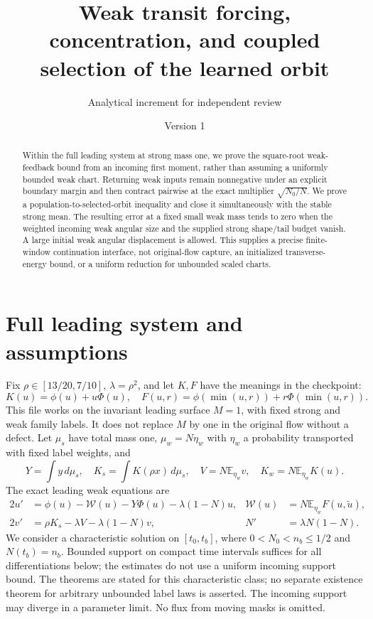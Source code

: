 \documentclass[11pt]{article}
\title{Weak transit forcing, concentration, and coupled selection of the learned orbit}
\author{Analytical increment for independent review}\date{Version 1}
\numberwithin{equation}{section}
\theoremstyle{remark}\newtheorem{remark}[theorem]{Remark}
\newcommand{\dd}{\,d}\newcommand{\E}{\mathbb E}\newcommand{\R}{\mathbb R}
\begin{document}
\maketitle
\begin{abstract}
Within the full leading system at strong mass one, we prove the square-root weak-feedback bound from an incoming first moment, rather than assuming a uniformly bounded weak chart. Returning weak inputs remain nonnegative under an explicit boundary margin and then contract pairwise at the exact multiplier $\sqrt{N_0/N}$. We prove a population-to-selected-orbit inequality and close it simultaneously with the stable strong mean. The resulting error at a fixed small weak mass tends to zero when the weighted incoming weak angular size and the supplied strong shape/tail budget vanish. A large initial weak angular displacement is allowed. This supplies a precise finite-window continuation interface, not original-flow capture, an initialized transverse-energy bound, or a uniform reduction for unbounded scaled charts.
\end{abstract}

\section{Full leading system and assumptions}\label{inc:AN03:weak:v1:setup}
Fix $\rho\in[13/20,7/10]$, $\lambda=\rho^2$, and let $K,F$ have the meanings in the checkpoint:
\[
 K(u)=\phi(u)+u\Phi(u),\quad
 F(u,r)=\phi(\min(u,r))+r\Phi(\min(u,r)).
\]
This file works on the invariant leading surface $M=1$, with fixed strong and weak family labels. It does not replace $M$ by one in the original flow without a defect. Let $\mu_s$ have total mass one, $\mu_w=N\eta_w$ with $\eta_w$ a probability transported with fixed label weights, and
\[
 Y=\int y\dd\mu_s,\quad K_s=\int K(\rho x)\dd\mu_s,\quad
 V=N\E_{\eta_w}v,\quad K_w=N\E_{\eta_w}K(u).
\]
The exact leading weak equations are
\begin{align}
 2u'&=\phi(u)-\mathcal W(u)-Y\Phi(u)-\lambda(1-N)u,
       &\mathcal W(u)&=N\E_{\eta_w}F(u,\widetilde u),\label{inc:AN03:weak:v1:weakfield}\\
 2v'&=\rho K_s-\lambda V-\lambda(1-N)v,
       &N'&=\lambda N(1-N).\nonumber
\end{align}
We consider a characteristic solution on $[t_0,t_b]$, where $0<N_0<n_b\le1/2$ and $N(t_b)=n_b$. Bounded support on compact time intervals suffices for all differentiations below; the estimates do not use a uniform incoming support bound. The theorems are stated for this characteristic class; no separate existence theorem for arbitrary unbounded label laws is asserted. The incoming support may diverge in a parameter limit. No flux from moving masks is omitted.
\end{document}
